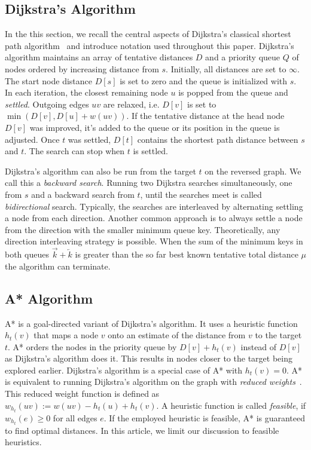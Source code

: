 \documentclass[manuscript,review]{acmart}
\begin{document}
\subsection{Dijkstra's Algorithm}

In the this section, we recall the central aspects of Dijkstra's classical shortest path algorithm~\cite{d-ntpcg-59} and introduce notation used throughout this paper.
Dijkstra's algorithm maintains an array of tentative distances $D$ and a priority queue $Q$ of nodes ordered by increasing distance from $s$.
Initially, all distances are set to $\infty$.
The start node distance $D[s]$ is set to zero and the queue is initialized with $s$.
In each iteration, the closest remaining node $u$ is popped from the queue and \emph{settled}.
Outgoing edges $uv$ are relaxed, i.e. $D[v]$ is set to $\min(D[v], D[u] + w(uv))$.
If the tentative distance at the head node $D[v]$ was improved, it's added to the queue or its position in the queue is adjusted.
Once $t$ was settled, $D[t]$ contains the shortest path distance between $s$ and $t$.
The search can stop when $t$ is settled.


Dijkstra's algorithm can also be run from the target $t$ on the reversed graph.
We call this a \emph{backward search}.
Running two Dijkstra searches simultaneously, one from $s$ and a backward search from $t$, until the searches meet is called \emph{bidirectional} search.
Typically, the searches are interleaved by alternating settling a node from each direction.
Another common approach is to always settle a node from the direction with the smaller minimum queue key.
Theoretically, any direction interleaving strategy is possible.
When the sum of the minimum keys in both queues $\overrightarrow{k} + \overleftarrow{k}$ is greater than the so far best known tentative total distance $\mu$ the algorithm can terminate.

\subsection{A* Algorithm}\label{sec:a_star}

A* is a goal-directed variant of Dijkstra's algorithm.
It uses a heuristic function $h_t(v)$ that maps a node $v$ onto an estimate of the distance from $v$ to the target $t$.
A* orders the nodes in the priority queue by $D[v] + h_t(v)$ instead of $D[v]$ as Dijkstra's algorithm does it.
This results in nodes closer to the target being explored earlier.
Dijkstra's algorithm is a special case of A*  with $h_t(v)=0$.
A* is equivalent to running Dijkstra's algorithm on the graph with \emph{reduced weights}~\cite{hnr-afbhd-68}.
This reduced weight function is defined as $w_{h_t}(uv) := w(uv) - h_t(u) + h_t(v)$.
A heuristic function is called \emph{feasible}, if $w_{h_t}(e) \geq 0$ for all edges $e$.
If the employed heuristic is feasible, A* is guaranteed to find optimal distances.
In this article, we limit our discussion to feasible heuristics.
\end{document}
